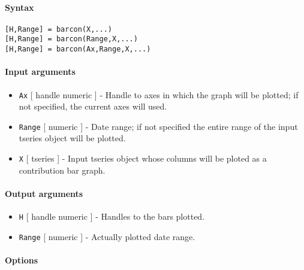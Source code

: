 


	\paragraph{Syntax}

\begin{verbatim}
[H,Range] = barcon(X,...)
[H,Range] = barcon(Range,X,...)
[H,Range] = barcon(Ax,Range,X,...)
\end{verbatim}

\paragraph{Input arguments}

\begin{itemize}
\item
  \texttt{Ax} {[} handle \textbar{} numeric {]} - Handle to axes in
  which the graph will be plotted; if not specified, the current axes
  will used.
\item
  \texttt{Range} {[} numeric {]} - Date range; if not specified the
  entire range of the input tseries object will be plotted.
\item
  \texttt{X} {[} tseries {]} - Input tseries object whose columns will
  be ploted as a contribution bar graph.
\end{itemize}

\paragraph{Output arguments}

\begin{itemize}
\item
  \texttt{H} {[} handle \textbar{} numeric {]} - Handles to the bars
  plotted.
\item
  \texttt{Range} {[} numeric {]} - Actually plotted date range.
\end{itemize}

\paragraph{Options}

